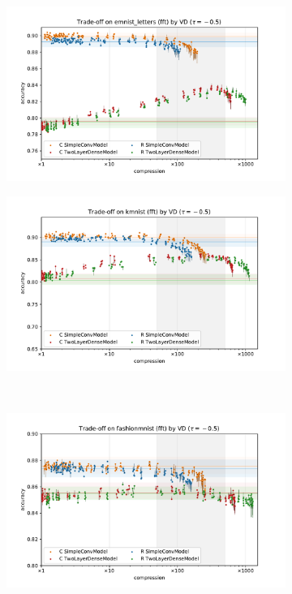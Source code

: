 \documentclass[a4paper,10pt,onecolumn]{article}
\begin{document}
\begin{figure}[b]
  \centering
  \begin{subfigure}[b]{0.5\columnwidth}
    \centering
    \includegraphics[width=\linewidth]{figure__mnist-like__trade-off/legacy__VD__emnist_letters__fft__-0.5.pdf}
  \end{subfigure}%
  \begin{subfigure}[b]{0.5\columnwidth}
    \centering
    \includegraphics[width=\linewidth]{figure__mnist-like__trade-off/legacy__VD__kmnist__fft__-0.5.pdf}
  \end{subfigure} \\%
  \begin{subfigure}[b]{0.5\columnwidth}
    \centering
    \includegraphics[width=\linewidth]{figure__mnist-like__trade-off/legacy__VD__fashionmnist__fft__-0.5.pdf}

\end{subfigure}
\end{figure}
\end{document}
